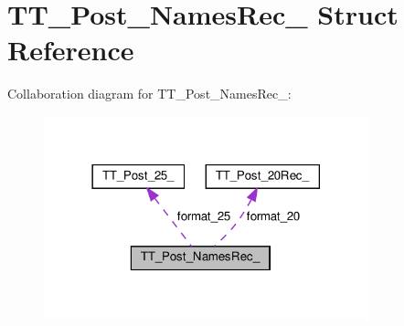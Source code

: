 \hypertarget{structTT__Post__NamesRec__}{}\section{T\+T\+\_\+\+Post\+\_\+\+Names\+Rec\+\_\+ Struct Reference}
\label{structTT__Post__NamesRec__}


Collaboration diagram for T\+T\+\_\+\+Post\+\_\+\+Names\+Rec\+\_\+\+:
\nopagebreak
\begin{figure}[H]
\begin{center}
\leavevmode
\includegraphics[width=266pt]{structTT__Post__NamesRec____coll__graph}
\end{center}
\end{figure}
